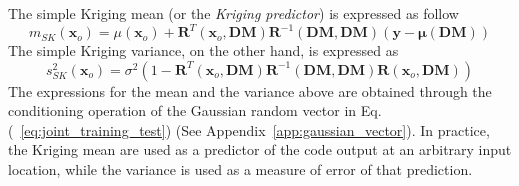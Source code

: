 The simple Kriging mean (or the \emph{Kriging predictor}) is expressed as follow
\begin{equation}
	m_{SK} (\mathbf{x}_o) = \mu (\mathbf{x}_o) + \mathbf{R}^T(\mathbf{x}_o, \mathbf{DM}) \mathbf{R}^{-1}(\mathbf{DM}, \mathbf{DM}) (\mathbf{y} - \boldsymbol{\mu}(\mathbf{DM}))
\label{eq:mean_sk}
\end{equation}
The simple Kriging variance, on the other hand, is expressed as
\begin{equation}
	s^2_{SK} (\mathbf{x}_o) = \sigma^2 (1 - \mathbf{R}^T(\mathbf{x}_o, \mathbf{DM}) \mathbf{R}^{-1}(\mathbf{DM}, \mathbf{DM}) \mathbf{R}(\mathbf{x}_o, \mathbf{DM}))
\label{eq:variance_sk}
\end{equation}
The expressions for the mean and the variance above are obtained through the conditioning operation of the Gaussian random vector in Eq.(~\ref{eq:joint_training_test}) (See Appendix~\ref{app:gaussian_vector}). 
In practice, the Kriging mean are used as a predictor of the code output at an arbitrary input location, 
while the variance is used as a measure of error of that prediction.

